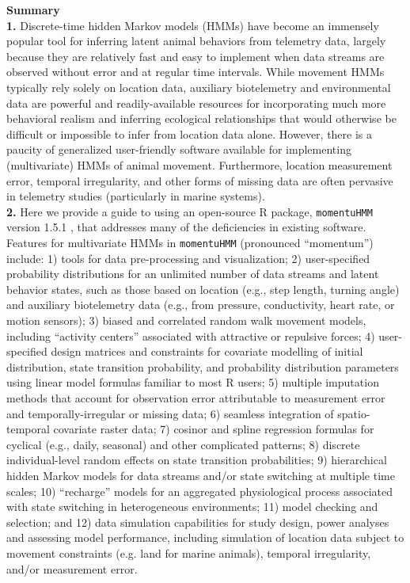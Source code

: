 \documentclass[12pt]{article}\usepackage[]{graphicx}\usepackage[]{color}
\begin{document}
\noindent \textbf{Summary}\\
\textbf{1.} Discrete-time hidden Markov models (HMMs) have become an immensely popular tool for inferring latent animal behaviors from telemetry data, largely because they are relatively fast and easy to implement when data streams are observed without error and at regular time intervals. While movement HMMs typically rely solely on location data, auxiliary biotelemetry and environmental data are powerful and readily-available resources for incorporating much more behavioral realism and inferring ecological relationships that would otherwise be difficult or impossible to infer from location data alone.  However, there is a paucity of generalized user-friendly software available for implementing (multivariate) HMMs of animal movement. Furthermore, location measurement error, temporal irregularity, and other forms of missing data are often pervasive in telemetry studies (particularly in marine systems).\\ %
\textbf{2.} Here we provide a guide to using an open-source R package, \verb|momentuHMM| version 1.5.1%
, that addresses many of the deficiencies in existing software.  Features for multivariate HMMs in \verb|momentuHMM| (pronounced ``momentum'') include: 1) tools for data pre-processing and visualization; 2) user-specified probability distributions for an unlimited number of data streams and latent behavior states, such as those based on location (e.g., step length, turning angle) and auxiliary biotelemetry data (e.g., from pressure, conductivity, heart rate, or motion sensors); 3) biased and correlated random walk movement models, including ``activity centers'' associated with attractive or repulsive forces; 4) user-specified design matrices and constraints for covariate modelling of initial distribution, state transition probability, and probability distribution parameters using linear model formulas familiar to most R users; 5) multiple imputation methods that account for observation error attributable to measurement error and temporally-irregular or missing data; 6) seamless integration of spatio-temporal covariate raster data; 7) cosinor and spline regression formulas for cyclical (e.g., daily, seasonal) and other complicated patterns; 8) discrete individual-level random effects on state transition probabilities; 9) hierarchical hidden Markov models for data streams and/or state switching at multiple time scales; 10) ``recharge'' models for an aggregated physiological process associated with state switching in heterogeneous environments; 11) model checking and selection; and 12) data simulation capabilities for study design, power analyses and assessing model performance, including simulation of location data subject to movement constraints (e.g. land for marine animals), temporal irregularity, and/or measurement error.\\ 
\end{document}
